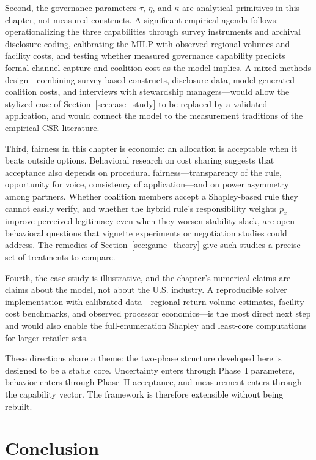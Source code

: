Second, the governance parameters $\tau$, $\eta$, and $\kappa$ are analytical primitives in this chapter, not measured constructs. A significant empirical agenda follows: operationalizing the three capabilities through survey instruments and archival disclosure coding, calibrating the MILP with observed regional volumes and facility costs, and testing whether measured governance capability predicts formal-channel capture and coalition cost as the model implies. A mixed-methods design---combining survey-based constructs, disclosure data, model-generated coalition costs, and interviews with stewardship managers---would allow the stylized case of Section~\ref{sec:case_study} to be replaced by a validated application, and would connect the model to the measurement traditions of the empirical CSR literature.

Third, fairness in this chapter is economic: an allocation is acceptable when it beats outside options. Behavioral research on cost sharing suggests that acceptance also depends on procedural fairness---transparency of the rule, opportunity for voice, consistency of application---and on power asymmetry among partners. Whether coalition members accept a Shapley-based rule they cannot easily verify, and whether the hybrid rule's responsibility weights $p_x$ improve perceived legitimacy even when they worsen stability slack, are open behavioral questions that vignette experiments or negotiation studies could address. The remedies of Section~\ref{sec:game_theory} give such studies a precise set of treatments to compare.

Fourth, the case study is illustrative, and the chapter's numerical claims are claims about the model, not about the U.S. industry. A reproducible solver implementation with calibrated data---regional return-volume estimates, facility cost benchmarks, and observed processor economics---is the most direct next step and would also enable the full-enumeration Shapley and least-core computations for larger retailer sets.

These directions share a theme: the two-phase structure developed here is designed to be a stable core. Uncertainty enters through Phase~I parameters, behavior enters through Phase~II acceptance, and measurement enters through the capability vector. The framework is therefore extensible without being rebuilt.

\section{Conclusion}
\label{sec:model_conclusion}

